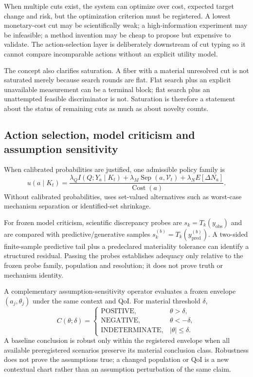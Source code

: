 When multiple cuts exist, the system can optimize over cost, expected target change and risk, but the optimization criterion must be registered. A lowest monetary-cost cut may be scientifically weak; a high-information experiment may be infeasible; a method invention may be cheap to propose but expensive to validate. The action-selection layer is deliberately downstream of cut typing so it cannot compare incomparable actions without an explicit utility model.

The concept also clarifies saturation. A fiber with a material unresolved cut is not saturated merely because search rounds are flat. Flat search plus an explicit unavailable measurement can be a terminal block; flat search plus an unattempted feasible discriminator is not. Saturation is therefore a statement about the status of remaining cuts as much as about novelty counts.

\subsection{Action selection, model criticism and assumption sensitivity}
When calibrated probabilities are justified, one admissible policy family is
\begin{equation}u(a\mid K_t)=\frac{\lambda_Q I(Q;Y_a\mid K_t)+\lambda_M\operatorname{Sep}(a,\mathcal V_t)+\lambda_N E[\Delta N_a]}{\operatorname{Cost}(a)}.\end{equation}
Without calibrated probabilities, \RAKL{} uses set-valued alternatives such as worst-case mechanism separation or identified-set shrinkage.

For frozen model criticism, scientific discrepancy probes are $s_k=T_k(y_{\mathrm{obs}})$ and are compared with predictive/generative samples $s_k^{(b)}=T_k(y_{\mathrm{pred}}^{(b)})$. A two-sided finite-sample predictive tail plus a predeclared materiality tolerance can identify a structured residual. Passing the probes establishes adequacy only relative to the frozen probe family, population and resolution; it does not prove truth or mechanism identity.

A complementary assumption-sensitivity operator evaluates a frozen envelope $(a_j,\theta_j)$ under the same context and QoI. For material threshold $\delta$,
\begin{equation}
C(\theta;\delta)=
\begin{cases}
\mathrm{POSITIVE}, & \theta>\delta,\\
\mathrm{NEGATIVE}, & \theta<-\delta,\\
\mathrm{INDETERMINATE}, & |\theta|\le\delta.
\end{cases}
\end{equation}
A baseline conclusion is robust only within the registered envelope when all available preregistered scenarios preserve its material conclusion class. Robustness does not prove the assumptions true; a changed population or QoI is a new contextual chart rather than an assumption perturbation of the same claim.

